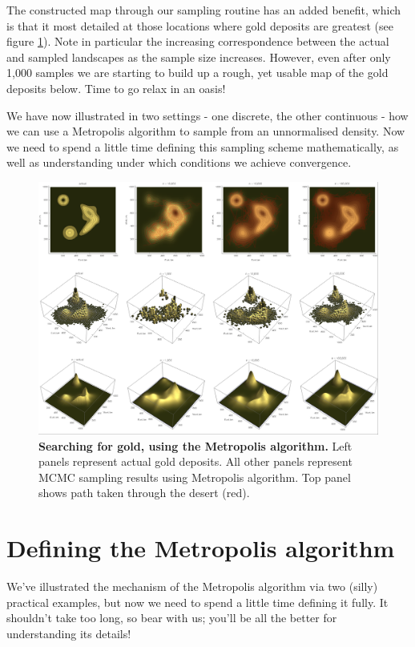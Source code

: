 \documentclass[11pt,fullpage]{book}
\begin{document}
The constructed map through our sampling routine has an added benefit, which is that it most detailed at those locations where gold deposits are greatest (see figure \ref{fig:metropolisHastings_miningGoldMetropolis}). Note in particular the increasing correspondence between the actual and sampled landscapes as the sample size increases. However, even after only 1,000 samples we are starting to build up a rough, yet usable map of the gold deposits below. Time to go relax in an oasis!

We have now illustrated in two settings - one discrete, the other continuous - how we can use a Metropolis algorithm to sample from an unnormalised density. Now we need to spend a little time defining this sampling scheme mathematically, as well as understanding under which conditions we achieve convergence. 


\begin{figure}
\centerline{\includegraphics[width=1.5\textwidth]{metropolisHastings_miningGoldMetropolis.png}}
\caption{\textbf{Searching for gold, using the Metropolis algorithm.} Left panels represent actual gold deposits. All other panels represent MCMC sampling results using Metropolis algorithm. Top panel shows path taken through the desert (red).}\label{fig:metropolisHastings_miningGoldMetropolis}
\end{figure}

\section{Defining the Metropolis algorithm}\label{sec:metropolisHastings_definingMetropolis}
We've illustrated the mechanism of the Metropolis algorithm via two (silly) practical examples, but now we need to spend a little time defining it fully. It shouldn't take too long, so bear with us; you'll be all the better for understanding its details!
\end{document}
